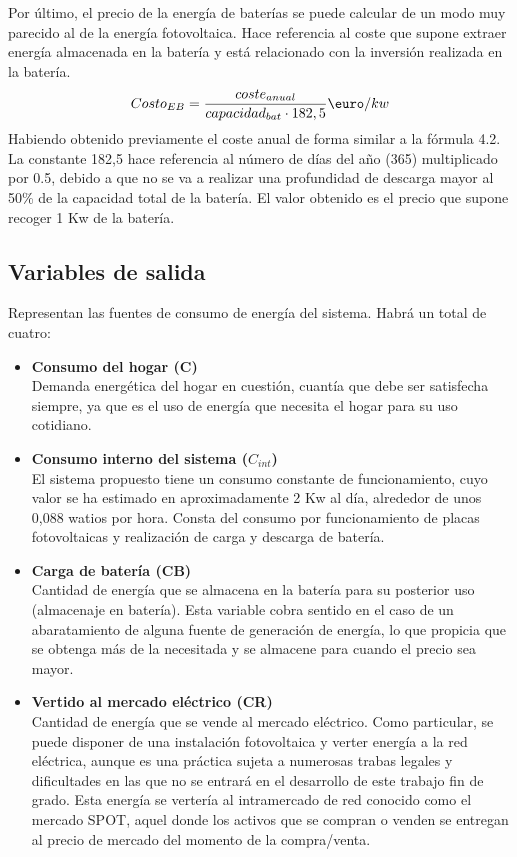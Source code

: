 	Por último, el precio de la energía de baterías se puede calcular de un modo muy parecido al de la energía fotovoltaica. Hace referencia al coste que supone extraer energía almacenada en la batería y está relacionado con la inversión realizada en la batería. 
	\begin{equation}\label{Costo_EB}
	Costo_{EB} = \frac{coste_{anual}}{capacidad_{bat}\cdot182,5} \textup{\euro}/kw
	\end{equation}
	Habiendo obtenido previamente el coste anual de forma similar a la fórmula 4.2. La constante 182,5 hace referencia al número de días del año (365) multiplicado por 0.5, debido a que no se va a realizar una profundidad de descarga mayor al 50\% de la capacidad total de la batería. El valor obtenido es el precio que supone recoger 1 Kw de la batería.
\subsection{Variables de salida}
Representan las fuentes de consumo de energía del sistema. Habrá un total de cuatro:
\begin{itemize}
	\item \textbf{Consumo del hogar (C)}\\Demanda energética del hogar en cuestión, cuantía que debe ser satisfecha siempre, ya que es el uso de energía que necesita el hogar para su uso cotidiano.
	\item \textbf{Consumo interno del sistema ($ C_{int} $)}\\El sistema propuesto tiene un consumo constante de funcionamiento, cuyo valor se ha estimado en aproximadamente 2 Kw al día, alrededor de unos 0,088 watios por hora. Consta del consumo por funcionamiento de placas fotovoltaicas y realización de carga y descarga de batería.
	\item \textbf{Carga de batería (CB)}\\Cantidad de energía que se almacena en la batería para su posterior uso (almacenaje en batería). Esta variable cobra sentido en el caso de un abaratamiento de alguna fuente de generación de energía, lo que propicia que se obtenga más de la necesitada y se almacene para cuando el precio sea mayor.  
	\item \textbf{Vertido al mercado eléctrico (CR)}\\Cantidad de energía que se vende al mercado eléctrico. Como particular, se puede disponer de una instalación fotovoltaica y verter energía a la red eléctrica, aunque es una práctica sujeta a numerosas trabas legales y dificultades en las que no se entrará en el desarrollo de este trabajo fin de grado. Esta energía se vertería al intramercado de red conocido como el mercado SPOT, aquel donde los activos que se compran o venden se entregan al precio de mercado del momento de la compra/venta. 
\end{itemize}


